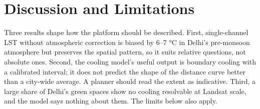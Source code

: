 \documentclass[conference]{IEEEtran}
\begin{document}
\section{Discussion and Limitations}\label{discussion-and-limitations}

Three results shape how the platform should be described. First,
single-channel LST without atmospheric correction is biased by 6--7 °C
in Delhi's pre-monsoon atmosphere but preserves the spatial pattern, so
it suits relative questions, not absolute ones. Second, the cooling
model's useful output is boundary cooling with a calibrated interval; it
does not predict the shape of the distance curve better than a city-wide
average. A planner should read the extent as indicative. Third, a large
share of Delhi's green spaces show no cooling resolvable at Landsat
scale, and the model says nothing about them. The limits below also
apply.
\end{document}
